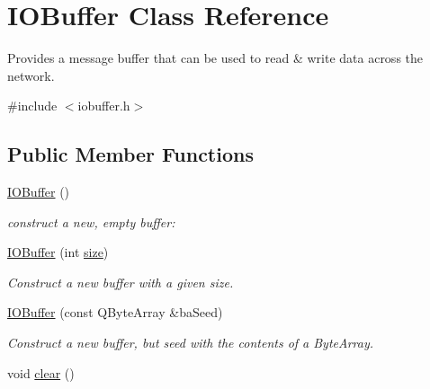 \hypertarget{class_i_o_buffer}{}\section{I\+O\+Buffer Class Reference}
\label{class_i_o_buffer}


Provides a message buffer that can be used to read \& write data across the network.  




{\ttfamily \#include $<$iobuffer.\+h$>$}

\subsection*{Public Member Functions}
\begin{DoxyCompactItemize}
\item 
\hyperlink{class_i_o_buffer_aaddfcb5f6c59ca99d262dd9fafd8ecf0}{I\+O\+Buffer} ()\hypertarget{class_i_o_buffer_aaddfcb5f6c59ca99d262dd9fafd8ecf0}{}\label{class_i_o_buffer_aaddfcb5f6c59ca99d262dd9fafd8ecf0}

\begin{DoxyCompactList}\small\item\em construct a new, empty buffer\+: \end{DoxyCompactList}\item 
\hyperlink{class_i_o_buffer_a196c8daea9e0cefa3419c8ecd91bc4c8}{I\+O\+Buffer} (int \hyperlink{class_i_o_buffer_a42b956c3deeece1c211f4d907b81df4f}{size})\hypertarget{class_i_o_buffer_a196c8daea9e0cefa3419c8ecd91bc4c8}{}\label{class_i_o_buffer_a196c8daea9e0cefa3419c8ecd91bc4c8}

\begin{DoxyCompactList}\small\item\em Construct a new buffer with a given size. \end{DoxyCompactList}\item 
\hyperlink{class_i_o_buffer_a0191b3fa615740b538b7c5967fe16020}{I\+O\+Buffer} (const Q\+Byte\+Array \&ba\+Seed)\hypertarget{class_i_o_buffer_a0191b3fa615740b538b7c5967fe16020}{}\label{class_i_o_buffer_a0191b3fa615740b538b7c5967fe16020}

\begin{DoxyCompactList}\small\item\em Construct a new buffer, but seed with the contents of a Byte\+Array. \end{DoxyCompactList}\item 
void \hyperlink{class_i_o_buffer_a0dc99315a3ce465ea4d9acd5d50e7ffb}{clear} ()\hypertarget{class_i_o_buffer_a0dc99315a3ce465ea4d9acd5d50e7ffb}{}\label{class_i_o_buffer_a0dc99315a3ce465ea4d9acd5d50e7ffb}


\end{DoxyCompactItemize}
